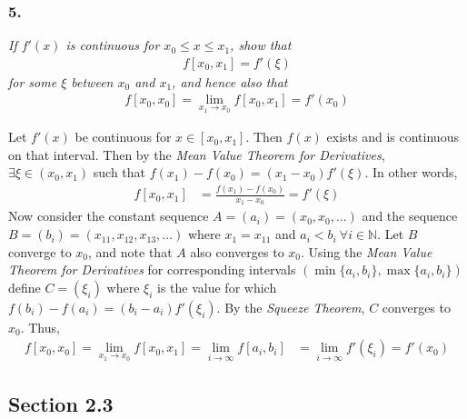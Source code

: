 \documentclass[12pt]{article}
\begin{document}
\subsubsection*{5.}

{\it If $f'(x)$ is continuous for $x_0 \leq x \leq x_1$, show that}
\begin{align*}
f[x_0, x_1] = f'(\xi)
\end{align*}
{\it for some $\xi$ between $x_0$ and $x_1$, and hence also that}
\begin{align*}
f[x_0, x_0] = \lim\limits_{x_1 \rightarrow x_0}f[x_0, x_1] = f'(x_0)
\end{align*}

\noindent Let $f'(x)$ be continuous for $x \in [x_0, x_1]$.  Then $f(x)$ exists and is continuous on that interval.  Then by the {\it Mean Value Theorem for Derivatives}, $\exists \xi \in (x_0, x_1)$ such that $f(x_1) - f(x_0) = (x_1 - x_0)f'(\xi)$.  In other words,
\begin{align*}
f[x_0, x_1] &= \frac{f(x_1) - f(x_0)}{x_1 - x_0} = f'(\xi)
\end{align*}
Now consider the constant sequence $A = (a_i) = (x_0, x_0, \dots)$ and the sequence $B = (b_i) = (x_{11}, x_{12}, x_{13}, \dots)$ where $x_1 = x_{11}$ and $a_i < b_i \ \forall i \in \mathbb{N}$.  Let $B$ converge to $x_0$, and note that $A$ also converges to $x_0$.  Using the {\it Mean Value Theorem for Derivatives} for corresponding intervals $(\min\{a_i, b_i\}, \max\{a_i, b_i\})$ define $C = (\xi_i)$ where $\xi_i$ is the value for which $f(b_i) - f(a_i) = (b_i - a_i)f'(\xi_i)$.  By the {\it Squeeze Theorem}, $C$ converges to $x_0$.  Thus,
\begin{align*}
f[x_0, x_0] = \lim\limits_{x_1 \rightarrow x_0}f[x_0, x_1] = \lim\limits_{i \rightarrow \infty}f[a_i, b_i] &= \lim\limits_{i \rightarrow \infty}f'(\xi_i) = f'(x_0)
\end{align*}

\subsection*{Section 2.3}
\end{document}
